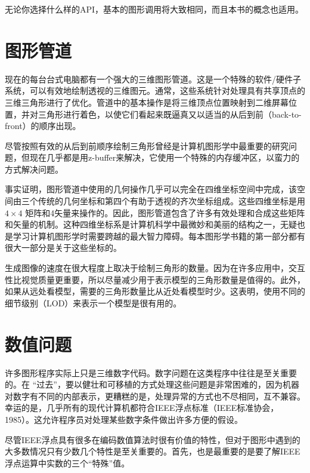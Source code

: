 \documentclass[lang=cn,12pt]{elegantbook}
\begin{document}
无论你选择什么样的API，基本的图形调用将大致相同，而且本书的概念也适用。

\section{图形管道}

现在的每台台式电脑都有一个强大的三维图形管道。这是一个特殊的软件/硬件子系统，可以有效地绘制透视的三维图元。通常，这些系统针对处理具有共享顶点的三维三角形进行了优化。管道中的基本操作是将三维顶点位置映射到二维屏幕位置，并对三角形进行着色，以使它们看起来既逼真又以适当的从后到前（back-to-front）的顺序出现。

尽管按照有效的从后到前顺序绘制三角形曾经是计算机图形学中最重要的研究问题，但现在几乎都是用z-buffer来解决，它使用一个特殊的内存缓冲区，以蛮力的方式解决问题。

事实证明，图形管道中使用的几何操作几乎可以完全在四维坐标空间中完成，该空间由三个传统的几何坐标和第四个有助于透视的齐次坐标组成。这些四维坐标是用 $4 \times 4$ 矩阵和4矢量来操作的。因此，图形管道包含了许多有效处理和合成这些矩阵和矢量的机制。这种四维坐标系是计算机科学中最微妙和美丽的结构之一，无疑也是学习计算机图形学时需要跨越的最大智力障碍。每本图形学书籍的第一部分都有很大一部分是关于这些坐标的。

生成图像的速度在很大程度上取决于绘制三角形的数量。因为在许多应用中，交互性比视觉质量更重要，所以尽量减少用于表示模型的三角形数量是值得的。此外，如果从远处看模型，需要的三角形数量比从近处看模型时少。这表明，使用不同的细节级别（LOD）来表示一个模型是很有用的。

\section{数值问题}

许多图形程序实际上只是三维数字代码。数字问题在这类程序中往往是至关重要的。在 “过去”，要以健壮和可移植的方式处理这些问题是非常困难的，因为机器对数字有不同的内部表示，更糟糕的是，处理异常的方式也不尽相同，互不兼容。幸运的是，几乎所有的现代计算机都符合IEEE浮点标准（IEEE标准协会，1985）。这允许程序员对处理某些数字条件做出许多方便的假设。


尽管IEEE浮点具有很多在编码数值算法时很有价值的特性，但对于图形中遇到的大多数情况只有少数几个特性是至关重要的。首先，也是最重要的是要了解IEEE浮点运算中实数的三个“特殊”值。
\end{document}
